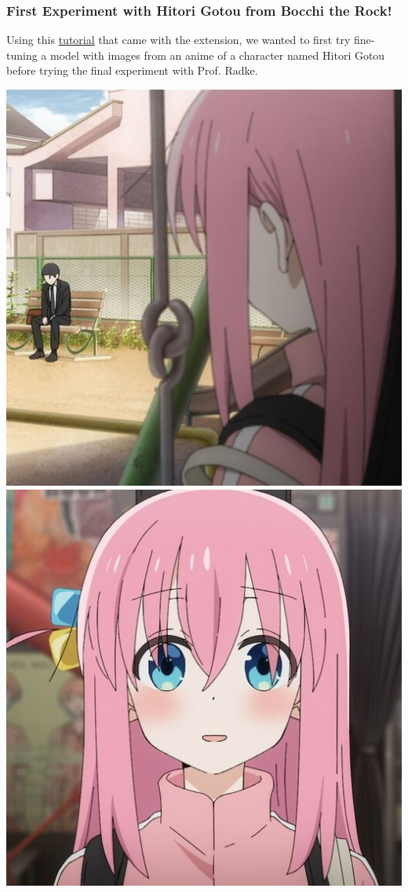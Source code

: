 \documentclass{article}
\begin{document}
\subsubsection{First Experiment with Hitori Gotou from Bocchi the Rock!}
Using this \href{https://github.com/d8ahazard/sd_dreambooth_extension/wiki/ELI5-Training}{tutorial} that came with the extension, we wanted to first try fine-tuning a model with images from an anime of a character named Hitori Gotou before trying the final experiment with Prof. Radke.
\begin{center}
    \includegraphics[scale=0.15]{.imgs/dataset/chrome_1DyVxJTRDj.jpg}
    \includegraphics[scale=0.15]{.imgs/dataset/chrome_9AQfr0PW0g.jpg}

\end{center}
\end{document}
